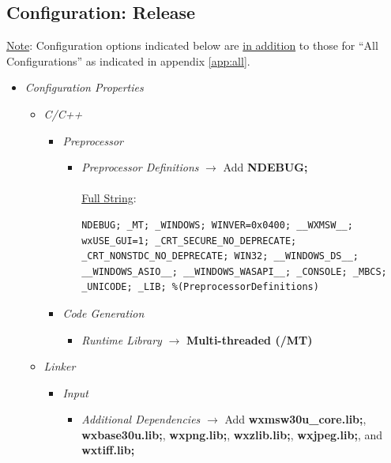 \documentclass[12pt]{report}
\begin{document}
\begin{appendices}
	\section{Configuration: Release} 
	\underline{Note}: Configuration options indicated below are \underline{in addition} to those for ``All Configurations'' as indicated in appendix \ref{app:all}.
	\begin{itemize} %
		\item \emph{Configuration Properties}
		\begin{itemize} %
			\item \emph{C/C++}
			\begin{itemize} %
				\item \emph{Preprocessor}
				\begin{itemize} %
					\item \emph{Preprocessor Definitions} $\rightarrow$ Add {\bf NDEBUG;} \\
						\\
						\underline{\scriptsize Full String}:
\begin{lstlisting}
NDEBUG; _MT; _WINDOWS; WINVER=0x0400; __WXMSW__; wxUSE_GUI=1; _CRT_SECURE_NO_DEPRECATE; _CRT_NONSTDC_NO_DEPRECATE; WIN32; __WINDOWS_DS__; __WINDOWS_ASIO__; __WINDOWS_WASAPI__; _CONSOLE; _MBCS; _UNICODE; _LIB; %(PreprocessorDefinitions)
\end{lstlisting}				
				\end{itemize} %
				\item \emph{Code Generation}
				\begin{itemize} %
					\item \emph{Runtime Library} $\rightarrow$ {\bf Multi-threaded (/MT)}
				\end{itemize} %
			\end{itemize} %
			\item \emph{Linker}
			\begin{itemize} %
				\item \emph{Input}
				\begin{itemize} %
					\item \emph{Additional Dependencies} $\rightarrow$ Add {\bf wxmsw30u{\_}core.lib;}, {\bf wxbase30u.lib;}, {\bf wxpng.lib;}, {\bf wxzlib.lib;}, {\bf wxjpeg.lib;}, and {\bf wxtiff.lib;}\\

\end{itemize}
\end{itemize}
\end{itemize}
\end{itemize}
\end{appendices}
\end{document}
